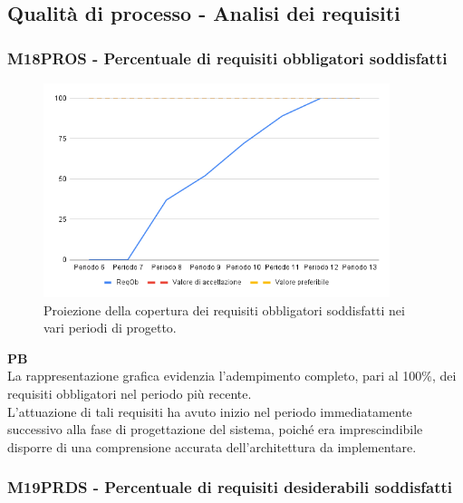 \subsection{Qualità di processo - Analisi dei requisiti}

\vspace{0.3cm}

\subsubsection{M18PROS - Percentuale di requisiti obbligatori soddisfatti}

\vspace{0.3cm}

\begin{figure}[H]
    \centering
    \includegraphics[width=0.9\textwidth]{../Images/PianoDiQualifica/PROS.png}
    \caption{Proiezione della copertura dei requisiti obbligatori soddisfatti nei vari periodi di progetto.}
    \label{fig:10}
\end{figure}

\vspace{0.2cm}

\textbf{PB} \\
La rappresentazione grafica evidenzia l’adempimento completo, pari al 100\%, dei requisiti obbligatori nel periodo più recente. \\
L’attuazione di tali requisiti ha avuto inizio nel periodo immediatamente successivo alla fase di progettazione del sistema, poiché era imprescindibile disporre di una comprensione accurata dell’architettura da implementare.

\subsubsection{M19PRDS - Percentuale di requisiti desiderabili soddisfatti}

